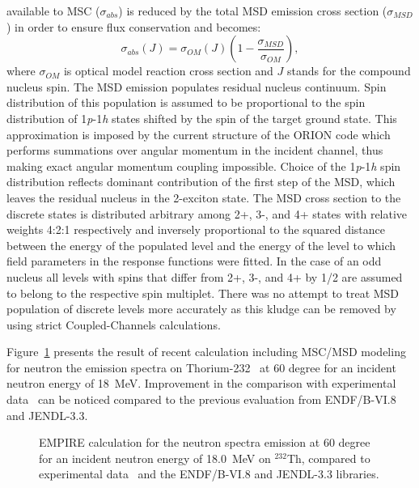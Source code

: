 \documentclass[twocolumn,amsmath,amssymb,10pt,groupedaddress,a4paper]{revtex4}
\begin{document}
available to MSC ($\sigma_{abs}$) is reduced by the total MSD emission
cross section ($\sigma_{MSD}$) in order to ensure flux conservation
and becomes:
\begin{equation}
\sigma_{abs}(J)=\sigma_{OM}(J)\left(1-\frac{\sigma_{MSD}}{\sigma_{OM}}\right),\label{CNabs}\end{equation}
\noindent where $\sigma_{OM}$ is optical model reaction cross section
and $J$ stands for the compound nucleus spin.
The MSD emission populates residual nucleus continuum.
Spin distribution of this population is assumed to be proportional
to the spin distribution of 1\emph{p}-1\emph{h} states shifted by
the spin of the target ground state. This approximation is imposed
by the current structure of the ORION code which performs
summations over angular momentum in the incident channel, thus making
exact angular momentum coupling impossible. Choice of the 1\emph{p}-1\emph{h}
spin distribution reflects dominant contribution of the first step
of the MSD, which leaves the residual nucleus in the 2-exciton
state.
The MSD cross section to the discrete states is distributed
arbitrary among 2+, 3-, and 4+ states with relative weights 4:2:1
respectively and inversely proportional to the squared distance between
the energy of the populated level and the energy of the level to which
field parameters in the response functions were fitted. In the case
of an odd nucleus all levels with spins that differ from 2+, 3-, and
4+ by 1/2 are assumed to belong to the respective spin multiplet.
There was no attempt to treat MSD population of discrete
levels more accurately as this kludge can be removed by using strict
Coupled-Channels calculations.

Figure~\ref{thoriumMSD} presents the result of recent calculation including
MSC/MSD modeling for neutron the emission spectra on Thorium-232~\cite{crp} at
60 degree for an incident neutron energy of 18~MeV. Improvement in the comparison
with experimental data~\cite{mats} can be noticed compared to the previous evaluation from
ENDF/B-VI.8 and JENDL-3.3.
\begin{figure}[htbp]
\caption{EMPIRE calculation for the neutron spectra emission at 60 degree for an incident neutron
 energy of 18.0~MeV on $^{232}$Th, compared to experimental data~\cite{mats} and the ENDF/B-VI.8 and
JENDL-3.3 libraries.}
\label{thoriumMSD}
\end{figure}
\end{document}
